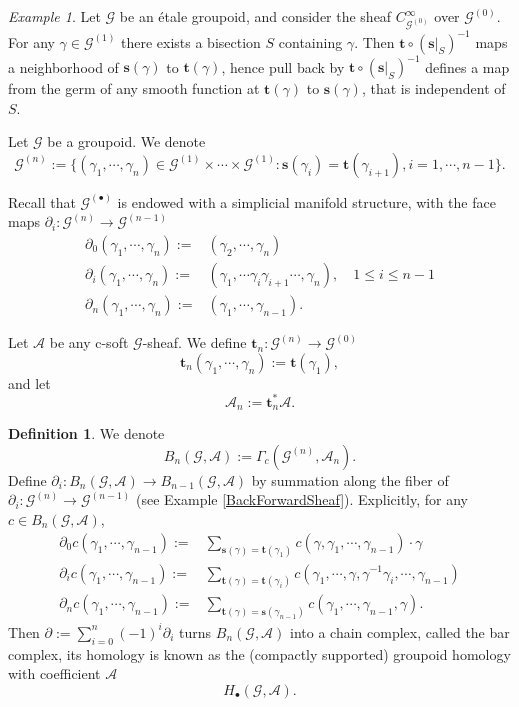 \documentclass[a4paper]{amsart}
\newcommand{\maA}{\mathcal A}
\newcommand{\maG}{\mathcal G}
\newcommand{\bs}{\mathbf{s}}
\newcommand{\bt}{\mathbf{t}}
\newcommand\<{\langle}
\renewcommand\>{\rangle}
\theoremstyle{definition}
\newtheorem{dfn}[theorem]{Definition}
\theoremstyle{remark}
\newtheorem{ex}[theorem]{Example}
\begin{document}
\begin{ex}
\label{SmoothGerms}
Let $\maG$ be an \'etale groupoid, and consider the sheaf $C^\infty _{\maG ^{(0)}}$ over $\maG ^{(0)}$.
For any $\gamma \in \maG ^{(1)}$ there exists a bisection $S$ containing $\gamma$.
Then $\bt \circ (\bs |_S)^{-1}$ maps a neighborhood of $\bs (\gamma)$ to $\bt (\gamma)$,
hence pull back by $\bt \circ (\bs |_S)^{-1}$ defines a map from the germ of any smooth function at $\bt (\gamma)$ to $\bs (\gamma)$,
that is independent of $S$.
\end{ex}

Let $\maG$ be a groupoid. We denote
$$\maG ^{(n)} := \{(\gamma _1 , \cdots, \gamma_n ) \in \maG^{(1)} \times \cdots \times \maG^{(1)} :
\bs(\gamma_i) = \bt(\gamma _{i+1}), i = 1, \cdots, n-1 \}.$$

Recall that $\maG ^{(\bullet)}$ is endowed with a simplicial manifold structure,
with the face maps $\partial _i : \maG^{(n)} \to \maG ^{(n-1)}$
\begin{align}
\nonumber
\partial _0 (\gamma _1 , \cdots , \gamma _n ) :=& (\gamma _2, \cdots, \gamma _n) \\
\partial _i (\gamma _1 , \cdots , \gamma _n ) :=& (\gamma _1 , \cdots \gamma _i \gamma _{i+1} \cdots , \gamma _n ),
\quad 1 \leq i \leq n-1 \\ \nonumber
\partial _n (\gamma _1 , \cdots , \gamma _n ) :=& (\gamma _1, \cdots, \gamma _{n-1}).
\end{align}

Let $\maA$ be any c-soft $\maG$-sheaf.
We define $\bt_n : \maG ^{(n)} \to \maG^{(0)}$
\begin{equation}
\label{tn}
\bt_n (\gamma _1 , \cdots , \gamma _n ) := \bt ( \gamma _1 ),
\end{equation}
and let
$$\maA _n := \bt _n ^* \maA .$$
\begin{dfn}
\label{BarComplex}
We denote
$$ B_n (\maG , \maA) := \Gamma _c (\maG ^{(n)}, \maA _n). $$
Define $\partial_i : B_n (\maG, \maA) \to B_{n-1} (\maG, \maA)$
by summation along the fiber of $\partial_i : \maG^{(n)} \to \maG ^{(n-1)}$ (see Example \ref{BackForwardSheaf}).
Explicitly, for any $c \in B_n (\maG, \maA)$,
\begin{align*}
\label {FaceMaps}
\partial _0 c (\gamma _1 , \cdots , \gamma _{n-1} )
:=& \sum _{\bs (\gamma ) = \bt (\gamma _1)} c (\gamma , \gamma _1 , \cdots , \gamma _{n-1} ) \cdot \gamma \\
\partial _i c (\gamma _1 , \cdots , \gamma _{n-1} )
:=& \sum _{\bt (\gamma ) = \bt (\gamma _{i})} c (\gamma _1 , \cdots , \gamma, \gamma ^{-1} \gamma _i, \cdots, \gamma _{n-1}) \\
\partial _n c (\gamma _1 , \cdots , \gamma _{n-1} )
:=& \sum _{\bt (\gamma ) = \bs (\gamma _{n-1})} c (\gamma _1 , \cdots , \gamma _{n-1}, \gamma).
\end{align*}
Then $\partial := \sum _{i=0}^n (-1)^i \partial _i$ turns $B _n (\maG , \maA)$ into a chain complex,
called the bar complex, its homology is known as the (compactly supported) groupoid homology with coefficient $\maA$
$$ H _\bullet (\maG, \maA ).$$
\end{dfn}
\end{document}

